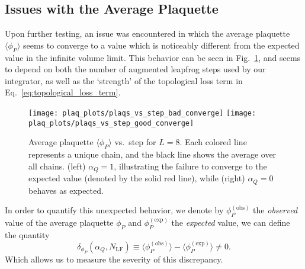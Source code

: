 \documentclass[../main.tex]{subfiles}
\begin{document}
\subsection*{Issues with the Average Plaquette}
%
Upon further testing, an issue was encountered in which the average plaquette $\langle \phi_{P}\rangle$ seems to
converge to a value which is noticeably different from the expected value in the infinite volume limit.
%
This behavior can be seen in Fig.~\ref{fig:bad_convergence}, and seems to depend on both the number of augmented
leapfrog steps used by our integrator, as well as the `strength' of the topological loss term in
Eq.~\ref{eq:topological_loss_term}.
%
\begin{figure}[htpb]\label{fig:bad_convergence}
  \centering
  \texttt{[image: plaq\_plots/plaqs\_vs\_step\_bad\_converge]} 
  \texttt{[image: plaq\_plots/plaqs\_vs\_step\_good\_converge]} 
  \caption{Average plaquette $\langle\phi_{P}\rangle$ vs.\ step for $L=8$. Each
    colored line represents a unique chain, and the black line shows the
    average over all chains.  (left) $\alpha_{Q} = 1$, illustrating the failure
    to converge to the expected value (denoted by the solid red line), while
    (right) $\alpha_{Q} = 0$ behaves as expected.}
\end{figure}
%
In order to quantify this unexpected behavior, we denote by $\phi_{P}^{(\mathrm{obs})}$ the \emph{observed} value of
the average plaquette $\phi_{P}$ and $\phi_{P}^{(\mathrm{exp})}$ the \emph{expected} value, we can define the quantity
%
\begin{equation}
  {\delta_{\phi_P}(\alpha_Q, N_{\mathrm{LF}}) \equiv \langle \phi_P^{\mathrm{(obs)}}\rangle 
  - \langle{\phi_{P}^{\mathrm{(exp)}}}\rangle \neq 0}.
\end{equation}
%
Which allows us to measure the severity of this discrepancy.%
%
%
\end{document}
